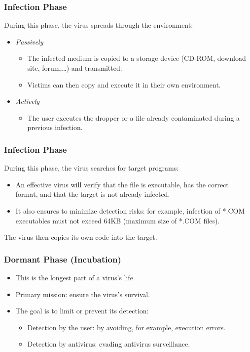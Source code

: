 \documentclass{beamer}
\newcommand{\enlight}[1]{\textit{\color{blue}#1}}
\begin{document}
\begin{frame}
\frametitle{Infection Phase}

During this phase, the virus spreads through the environment:
\begin{itemize}
\item \enlight{Passively}
\begin{itemize}
\item  The infected medium is copied to a storage device (CD-ROM, download site, forum,\ldots) and transmitted.
  \medskip
\item Victims can then copy and execute it in their own environment.
\end{itemize}
\medskip

\item \enlight{Actively}
\begin{itemize}
\item  The user executes the dropper or a file already contaminated during a previous infection.
  \end{itemize}
\end{itemize}
\end{frame}

\begin{frame}
\frametitle{Infection Phase}
During this phase, the virus searches for target programs: %
\begin{itemize}
\item An effective virus will verify that the file is executable, has the correct format, and that the target is not already infected.
\item It also ensures to minimize detection risks: for example, infection of *.COM executables must not exceed 64KB (maximum size of *.COM files).
\end{itemize}

The virus then copies its own code into the target.

\end{frame}



\begin{frame}
\frametitle{Dormant Phase (Incubation)}
\begin{itemize}
\item This is the longest part of a virus's life.
\item Primary mission: ensure the virus's survival.
\item The goal is to limit or prevent its detection:
\begin{itemize}
\item Detection by the user: by avoiding, for example, execution errors.%
  \bigskip
\item Detection by antivirus: evading antivirus surveillance.

\end{itemize}
\end{itemize}
\end{frame}
\end{document}
